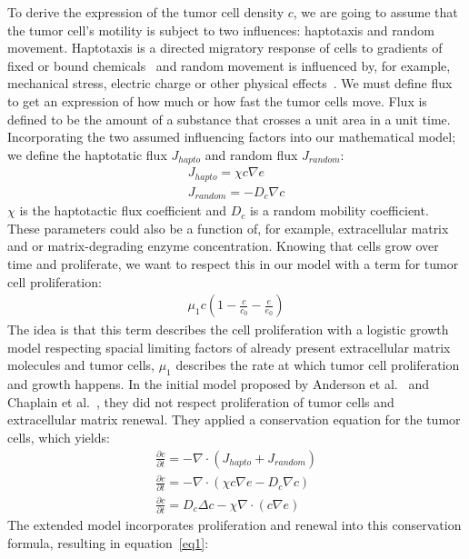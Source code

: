 To derive the expression of the tumor cell density $c$, we are going to assume that the tumor cell's motility is subject to two influences: haptotaxis and random movement. Haptotaxis is a directed migratory response of cells to gradients of fixed or bound chemicals~\cite{anderson_continuous_1998} and random movement is influenced by, for example, mechanical stress, electric charge or other physical effects~\cite{Merino-Casallo2022-di}. We must define flux to get an expression of how much or how fast the tumor cells move. Flux is defined to be the amount of a substance that crosses a unit area in a unit time. Incorporating the two assumed influencing factors into our mathematical model; we define the haptotatic flux $J_{hapto}$ and random flux $J_{random}$:
\begin{align*}
    J_{hapto} = \chi c \nabla e \\
    J_{random} = -D_c \nabla c
\end{align*}
$\chi$ is the haptotactic flux coefficient and $D_c$ is a random mobility coefficient. These parameters could also be a function of, for example, extracellular matrix and or matrix-degrading enzyme concentration. Knowing that cells grow over time and proliferate, we want to respect this in our model with a term for tumor cell 
proliferation: 
\begin{align*}
    \mu_1 c (1-\frac{c}{c_0} - \frac{e}{e_0})
\end{align*}
The idea is that this term describes the cell proliferation with a logistic growth model respecting spacial limiting factors of already present extracellular matrix molecules and tumor cells, $\mu_1$ describes the rate at which tumor cell proliferation and growth happens. In the initial model proposed by Anderson et al.~\cite{anderson_continuous_1998, anderson_mathematical_2000} and Chaplain et al.~\cite{anderson_continuous_1998,chaplain_mathematical_2006-1,franssen_mathematical_2019}, they did not respect proliferation of tumor cells and extracellular matrix renewal. They applied a conservation equation for the tumor cells, which yields:
\begin{align*}
    \frac{\partial c}{\partial t} = -\nabla \cdot (J_{hapto} + J_{random}) \\
    \frac{\partial c}{\partial t} = -\nabla \cdot (\chi c \nabla e -D_c \nabla c ) \\
    \frac{\partial c}{\partial t} = D_c \Delta c - \chi \nabla \cdot (c\nabla e)
\end{align*}
The extended model incorporates proliferation and renewal into this conservation formula, resulting in equation~\ref{eq1}:
